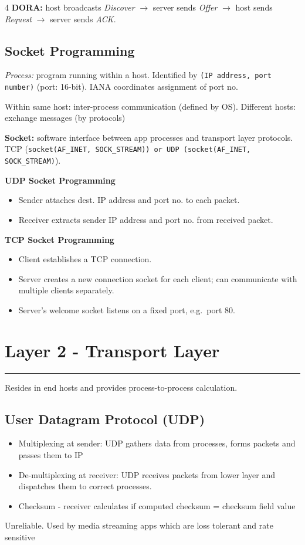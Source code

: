 \documentclass[10pt]{extarticle}
\newcommand{\sectionrule}{\vspace{-2pt}\hrule\vspace{2pt}}
\begin{document}
\begin{multicols}{4}
  \textbf{DORA:} host broadcasts \textit{Discover} $\rightarrow$ server sends \textit{Offer} $\rightarrow$ host sends \textit{Request} $\rightarrow$ server sends \textit{ACK}.

  \subsection{Socket Programming}
  \textit{Process: }program running within a host. Identified by \texttt{(IP address, port number)} (port: 16-bit). IANA coordinates assignment of port no.

  Within same host: inter-process communication (defined by OS). Different hosts: exchange messages (by protocols)

  \textbf{Socket: } software interface between app processes and transport layer protocols. TCP (\texttt{socket(AF\_INET, SOCK\_STREAM)) or UDP (socket(AF\_INET, SOCK\_STREAM)}).

  \textbf{UDP Socket Programming}
  \begin{itemize}
    \item Sender attaches dest. IP address and port no. to each packet.
    \item Receiver extracts sender IP address and port no. from received packet.
  \end{itemize}

  \textbf{TCP Socket Programming}
  \begin{itemize}
    \item Client establishes a TCP connection.
    \item Server creates a new connection socket for each client; can communicate with multiple clients separately.
    \item Server's welcome socket listens on a fixed port, e.g.\ port $80$.
  \end{itemize}

  \section*{Layer 2 - Transport Layer}
  \sectionrule
  Resides in end hosts and provides process-to-process calculation.

  \subsection{User Datagram Protocol (UDP)}
  \begin{itemize}
    \item Multiplexing at sender: UDP gathers data from processes, forms packets and passes them to IP
    \item De-multiplexing at receiver: UDP receives packets from lower layer and dispatches them to correct processes.
    \item Checksum - receiver calculates if computed checksum = checksum field value
  \end{itemize}
  Unreliable. Used by media streaming apps which are loss tolerant and rate sensitive


\end{multicols}
\end{document}
